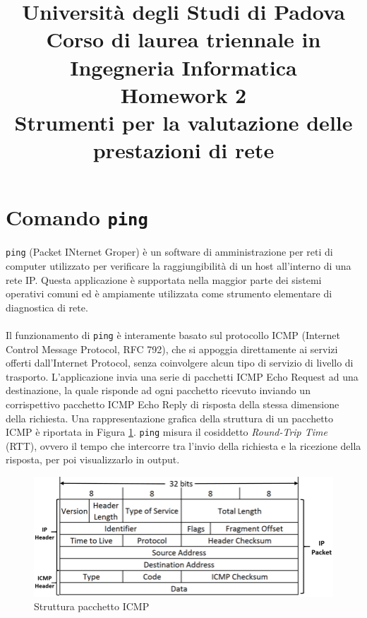 \documentclass[a4paper,10pt]{article}
\begin{document}
   \title{{\large Università degli Studi di Padova \\ } {\normalsize Corso di laurea triennale in Ingegneria Informatica}\\ \vspace{1.8cm} \textbf{ Homework 2}\\{\normalsize Strumenti per la valutazione delle prestazioni di rete}}

   \maketitle
   \vspace{7.2cm}
   \renewcommand{\contentsname}{Indice}      
   \tableofcontents
   \newpage

\section{Comando \texttt{ping} }
\texttt{ping} (Packet INternet Groper) è un software di amministrazione per reti di computer utilizzato per verificare la raggiungibilità di un host all'interno di una rete IP. Questa applicazione è supportata nella maggior parte dei sistemi operativi comuni ed è ampiamente utilizzata come strumento elementare di diagnostica di rete. \\\\
Il funzionamento di \texttt{ping} è interamente basato sul protocollo ICMP (Internet Control Message Protocol, RFC 792), che si appoggia direttamente ai servizi offerti dall'Internet Protocol, senza coinvolgere alcun tipo di servizio di livello di trasporto. L'applicazione invia una serie di pacchetti ICMP Echo Request ad una destinazione, la quale risponde ad ogni pacchetto ricevuto inviando un corrispettivo pacchetto ICMP Echo Reply di risposta della stessa dimensione della richiesta. Una rappresentazione grafica della struttura di un pacchetto ICMP è riportata in Figura \ref{fig:ICMP}. \texttt{ping} misura il cosiddetto \textit{Round-Trip Time} (RTT), ovvero il tempo che intercorre tra l'invio della richiesta e la ricezione della risposta, per poi visualizzarlo in output.

\begin{figure}[h!]
	\centering
	\includegraphics[scale=0.25]{img/icmp.png}
  	\caption{Struttura pacchetto ICMP \cite{ref:icmp}}
  	\label{fig:ICMP}
\end{figure}
\end{document}

